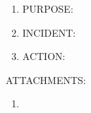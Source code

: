 \documentclass[letterpaper,11pt]{texMemo}
\begin{document}
\maketitle

\begin{enumerate}
\item PURPOSE: 
\item INCIDENT: 
\item ACTION: 
\end{enumerate}

ATTACHMENTS:
\begin{enumerate}
\item 
\end{enumerate}
\end{document}
